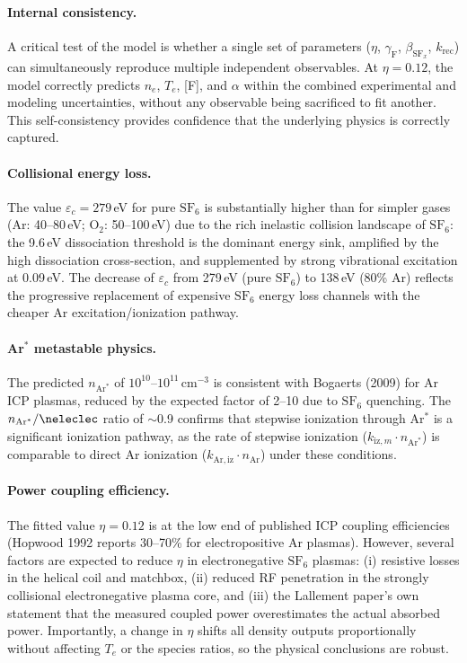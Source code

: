 \documentclass[11pt,a4paper]{article}
\newcommand{\SFx}{\mathrm{SF}_x}
\newcommand{\SFsix}{\mathrm{SF}_6}
\newcommand{\Ar}{\mathrm{Ar}}
\newcommand{\Te}{T_e}
\newcommand{\nelec}{n_e}
\begin{document}
\paragraph{Internal consistency.}  A critical test of the model is whether a single set of parameters ($\eta$, $\gamma_\mathrm{F}$, $\beta_{\SFx}$, $k_\mathrm{rec}$) can simultaneously reproduce multiple independent observables.  At $\eta = 0.12$, the model correctly predicts $\nelec$, $\Te$, [F], and $\alpha$ within the combined experimental and modeling uncertainties, without any observable being sacrificed to fit another.  This self-consistency provides confidence that the underlying physics is correctly captured.

\paragraph{Collisional energy loss.}  The value $\varepsilon_c = 279$\,eV for pure $\SFsix$ is substantially higher than for simpler gases (Ar: 40--80\,eV; O$_2$: 50--100\,eV) due to the rich inelastic collision landscape of $\SFsix$: the 9.6\,eV dissociation threshold is the dominant energy sink, amplified by the high dissociation cross-section, and supplemented by strong vibrational excitation at 0.09\,eV.  The decrease of $\varepsilon_c$ from 279\,eV (pure $\SFsix$) to 138\,eV (80\% Ar) reflects the progressive replacement of expensive $\SFsix$ energy loss channels with the cheaper Ar excitation/ionization pathway.

\paragraph{Ar$^*$ metastable physics.}  The predicted $n_{\Ar^*}$ of $10^{10}$--$10^{11}$\,cm$^{-3}$ is consistent with Bogaerts (2009) for Ar ICP plasmas, reduced by the expected factor of 2--10 due to $\SFsix$ quenching.  The $n_{\Ar^*}/\neleclec$ ratio of $\sim$0.9 confirms that stepwise ionization through Ar$^*$ is a significant ionization pathway, as the rate of stepwise ionization ($k_{\mathrm{iz},m} \cdot n_{\Ar^*}$) is comparable to direct Ar ionization ($k_{\Ar,\mathrm{iz}} \cdot n_\Ar$) under these conditions.

\paragraph{Power coupling efficiency.}  The fitted value $\eta = 0.12$ is at the low end of published ICP coupling efficiencies (Hopwood 1992 reports 30--70\% for electropositive Ar plasmas).  However, several factors are expected to reduce $\eta$ in electronegative $\SFsix$ plasmas: (i) resistive losses in the helical coil and matchbox, (ii) reduced RF penetration in the strongly collisional electronegative plasma core, and (iii) the Lallement paper's own statement that the measured coupled power overestimates the actual absorbed power.  Importantly, a change in $\eta$ shifts all density outputs proportionally without affecting $\Te$ or the species ratios, so the physical conclusions are robust.
\end{document}

